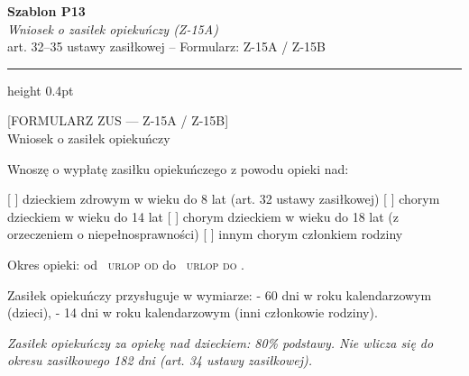 \documentclass[11pt,a4paper]{article}
\newcommand{\Pole}[1]{%
  \textcolor{szary}{\dotfill}\,%
  {\scriptsize\textcolor{szary}{\textsc{#1}}}%
}
\begin{document}
\begin{flushright}
{\footnotesize\color{szary}
\textbf{Szablon P13}\\
{\itshape Wniosek o zasiłek opiekuńczy (Z-15A)}\\
art. 32--35 ustawy zasiłkowej -- Formularz: Z-15A / Z-15B}\
\end{flushright}

\vspace{0.5em}
{\color{ramka}\hrule height 0.4pt}
\vspace{0.8em}

[FORMULARZ ZUS --- Z-15A / Z-15B]\\[-2pt]
Wniosek o zasiłek opiekuńczy

Wnoszę o wypłatę zasiłku opiekuńczego z powodu opieki nad:

[ ] dzieckiem zdrowym w wieku do 8 lat (art. 32 ustawy zasiłkowej)
[ ] chorym dzieckiem w wieku do 14 lat
[ ] chorym dzieckiem w wieku do 18 lat (z orzeczeniem o niepełnosprawności)
[ ] innym chorym członkiem rodziny

Okres opieki: od \Pole{urlop od} do \Pole{urlop do}.

Zasiłek opiekuńczy przysługuje w wymiarze:
- 60 dni w roku kalendarzowym (dzieci),
- 14 dni w roku kalendarzowym (inni członkowie rodziny).

\vfill
{\footnotesize\textcolor{szary}\itshape Zasiłek opiekuńczy za opiekę nad dzieckiem: 80\% podstawy. Nie wlicza się do okresu zasiłkowego 182 dni (art. 34 ustawy zasiłkowej). }
\end{document}

